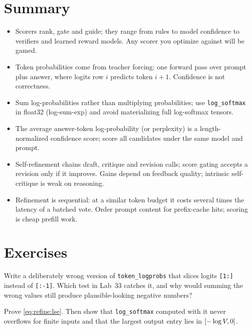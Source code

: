 \section{Summary}
\begin{itemize}
  \item Scorers rank, gate and guide; they range from rules to model confidence to verifiers and
  learned reward models. Any scorer you optimize against will be gamed.
  \item Token probabilities come from teacher forcing: one forward pass over prompt plus answer,
  where logits row $i$ predicts token $i{+}1$. Confidence is not correctness.
  \item Sum log-probabilities rather than multiplying probabilities; use \texttt{log\_softmax} in
  float32 (log-sum-exp) and avoid materializing full log-softmax tensors.
  \item The average answer-token log-probability (or perplexity) is a length-normalized confidence
  score; score all candidates under the same model and prompt.
  \item Self-refinement chains draft, critique and revision calls; score gating accepts a revision
  only if it improves. Gains depend on feedback quality; intrinsic self-critique is weak on reasoning.
  \item Refinement is sequential: at a similar token budget it costs several times the latency of a
  batched vote. Order prompt content for prefix-cache hits; scoring is cheap prefill work.
\end{itemize}

\section{Exercises}

\begin{exercise}
Write a deliberately wrong version of \texttt{token\_logprobs} that slices logits \texttt{[1:]}
instead of \texttt{[:-1]}. Which test in Lab~33 catches it, and why would summing the wrong values
still produce plausible-looking negative numbers?
\end{exercise}

\begin{exercise}
Prove \cref{eq:refine:lse}. Then show that \texttt{log\_softmax} computed with it never overflows for
finite inputs and that the largest output entry lies in $[-\log V, 0]$.
\end{exercise}

